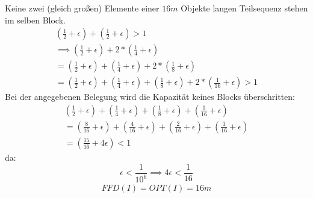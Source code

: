 \documentclass{article}
\begin{document}
Keine zwei (gleich großen) Elemente einer $16m$ Objekte langen Teilsequenz stehen im selben Block.
\begin{align*}
(\frac{1}{2}+\epsilon)+(\frac{1}{2}+\epsilon) > 1\\
\implies (\frac{1}{2}+\epsilon)+2*(\frac{1}{4}+\epsilon)\\ 
=(\frac{1}{2}+\epsilon)+(\frac{1}{4}+\epsilon)+2*(\frac{1}{8}+\epsilon)\\
=(\frac{1}{2}+\epsilon)+(\frac{1}{4}+\epsilon)+(\frac{1}{8}+\epsilon)+2*(\frac{1}{16}+\epsilon) > 1
\end{align*}
\newpage
Bei der angegebenen Belegung wird die Kapazität keines Blocks überschritten:\\
\begin{align*}
(\frac{1}{2}+\epsilon)+(\frac{1}{4}+\epsilon)+(\frac{1}{8}+\epsilon)+(\frac{1}{16}+\epsilon)\\
=(\frac{8}{16}+\epsilon)+(\frac{4}{16}+\epsilon)+(\frac{2}{16}+\epsilon)+(\frac{1}{16}+\epsilon)\\
=(\frac{15}{16}+4\epsilon)<1 
\end{align*}
da:\\
\begin{equation}
	\epsilon<\frac{1}{10^{6}} \implies 4\epsilon<\frac{1}{16}
\end{equation}
\begin{align*}
FFD(I)=OPT(I)=16m
\end{align*}
\end{document}

